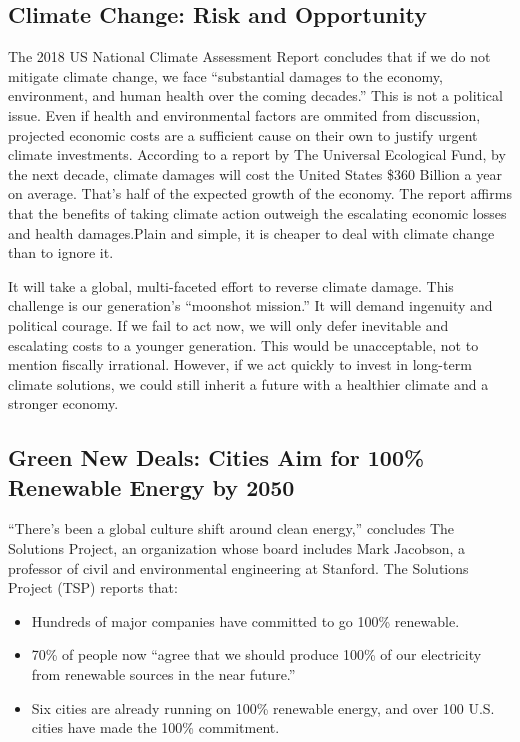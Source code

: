 \documentclass[hidelinks,12pt,a4paper]{article}
\begin{document}
\subsection{Climate Change: Risk and Opportunity}
The 2018 US National Climate Assessment Report concludes that if we do not mitigate climate change, we face “substantial damages to the economy, environment, and human health over the coming decades.” \cite{NationalClimateAssessmentReport} This is not a political issue. Even if health and environmental factors are ommited from discussion, projected economic costs are a sufficient cause on their own to justify urgent climate investments. According to a report by The Universal Ecological Fund, by the next decade, climate damages will cost the United States \$360 Billion a year on average. That's half of the expected growth of the economy. The report affirms that the benefits of taking climate action outweigh the escalating economic losses and health damages.\cite{TheEconomicCaseForClimateActionInTheUnitedStates}Plain and simple, it is cheaper to deal with climate change than to ignore it.

It will take a global, multi-faceted effort to reverse climate damage. This challenge is our generation's “moonshot mission.” It will demand ingenuity and political courage. If we fail to act now, we will only defer inevitable and escalating costs to a younger generation. This would be unacceptable, not to mention fiscally irrational. However, if we act quickly to invest in long-term climate solutions, we could still inherit a future with a healthier climate and a stronger economy.


\subsection{Green New Deals: Cities Aim for 100\% Renewable Energy by 2050}
“There’s been a global culture shift around clean energy,” \cite{TheSolutionsProject2018ImpactReport} concludes The Solutions Project, an organization whose board includes Mark Jacobson, a professor of civil and environmental engineering at Stanford. The Solutions Project (TSP) reports that: \cite{TheSolutionsProject2018ImpactReport}

{\footnotesize
\begin{itemize}
    \item Hundreds of major companies have committed to go 100\% renewable.
    \item 70\% of people now “agree that we should produce 100\% of our electricity from renewable sources in the near future.”
    \item Six cities are already running on 100\% renewable energy, and over 100 U.S. cities have made the 100\% commitment.
\end{itemize}
}
\end{document}
